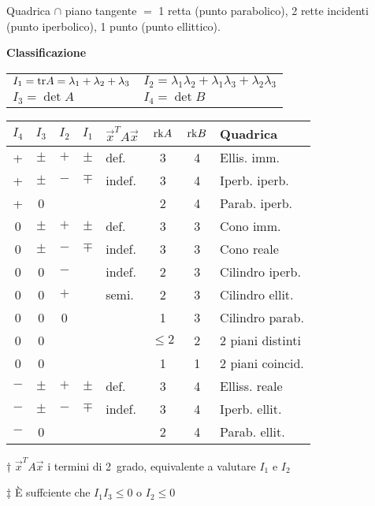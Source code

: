 Quadrica $\cap$ piano tangente $=$ 1 retta (punto parabolico), 2 rette incidenti (punto iperbolico), 1 punto (punto ellittico). 

\textbf{Classificazione}
\begin{tabular}{ll}
	$I_1=\mathrm{tr} A = \lambda_1+\lambda_2+\lambda_3$ & $I_2=\lambda_1\lambda_2+\lambda_1\lambda_3+\lambda_2\lambda_3$ \\
	$I_3 = \det A$ & $I_4 = \det B$
\end{tabular}

{
\begin{threeparttable}
\setlength{\tabcolsep}{0.5em}%
\begin{tabular}{c|c|c|c|l|c|c|l}
	\boldmath$I_4$
	         & \boldmath$I_3$
	                 & \boldmath$I_2$
	                       & \boldmath$I_1$
	                               & \boldmath$\vec{x}^TA\vec{x}$\tnote{†}
	                                          & \boldmath$\mathrm{rk} A$
	                                              & \boldmath$\mathrm{rk} B$
	                                                     & \textbf{Quadrica} \\
	\hline
	+        & $\pm$ & $+$ & $\pm$ & def.     & 3 & 4    & Ellis. imm. \\
	+        & $\pm$ & $-$\tnote{‡} & $\mp$ & indef.   & 3 & 4    & Iperb. iperb. \\
	+        & 0     &     &       &          & 2 & 4    & Parab. iperb. \\
	\hline
	0        & $\pm$ & $+$ & $\pm$ & def.     & 3 & 3    & Cono imm. \\
	0        & $\pm$ & $-$ & $\mp$ & indef.   & 3 & 3    & Cono reale \\
	0        & 0     & $-$ &       & indef.    & 2 & 3    & Cilindro iperb. \\
	0        & 0     & $+$ &       & semi.   & 2 & 3    & Cilindro ellit. \\
	0        & 0     & 0   &       &          & 1 & 3    & Cilindro parab. \\
	0        & 0     &     &       &          & $\le 2$ & 2    & 2 piani distinti \\
	0        & 0     &     &       &          & 1 & 1    & 2 piani coincid. \\
	\hline
	$-$      & $\pm$ & $+$ & $\pm$ & def.     & 3 & 4    & Elliss. reale \\
	$-$      & $\pm$ & $-$\tnote{‡} & $\mp$ & indef.   & 3 & 4    & Iperb. ellit. \\
	$-$      & 0     &     &       &          & 2 & 4    & Parab. ellit. \\
\end{tabular}
\begin{tablenotes}
	\item[†] $\vec{x}^TA\vec{x}$ i termini di 2\textdegree\ grado, equivalente a valutare $I_1$ e $I_2$
	\item[‡] È suffciente che $I_1I_3 \le 0$ o $I_2 \le 0$
\end{tablenotes}
\end{threeparttable}
}
